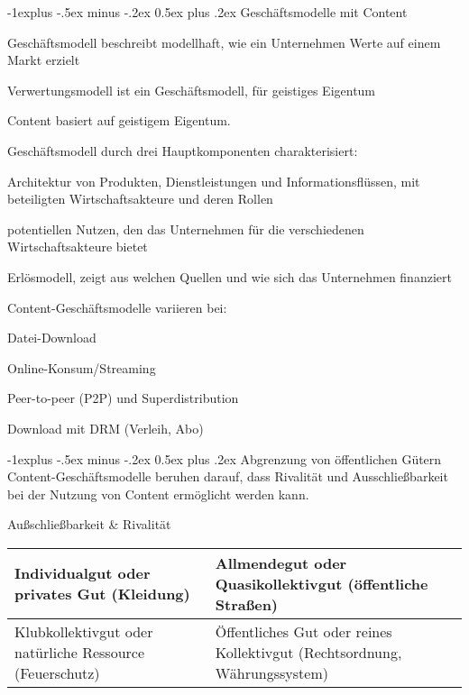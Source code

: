 \documentclass[a4paper]{article}
\makeatletter
\renewcommand{\subsection}{\@startsection{subsection}{2}{0mm}%
                                {-1explus -.5ex minus -.2ex}%
                                {0.5ex plus .2ex}%
                                {\normalfont\normalsize\bfseries}}
\makeatother
\begin{document}
\begin{multicols*}{2}
  \subsection{Geschäftsmodelle mit Content}
  \begin{itemize*}
    \item Geschäftsmodell beschreibt modellhaft, wie ein Unternehmen Werte auf einem Markt erzielt
    \item Verwertungsmodell ist ein Geschäftsmodell, für geistiges Eigentum
    \item Content basiert auf geistigem Eigentum.
    \item Geschäftsmodell durch drei Hauptkomponenten charakterisiert:
    \begin{itemize*}
      \item Architektur von Produkten, Dienstleistungen und Informationsflüssen, mit beteiligten Wirtschaftsakteure und deren Rollen
      \item potentiellen Nutzen, den das Unternehmen für die verschiedenen Wirtschaftsakteure bietet
      \item Erlösmodell, zeigt aus welchen Quellen und wie sich das Unternehmen finanziert
    \end{itemize*}
    \item Content-Geschäftsmodelle variieren bei:
    \begin{itemize*}
      \item Datei-Download
      \item Online-Konsum/Streaming
      \item Peer-to-peer (P2P) und Superdistribution
      \item Download mit DRM (Verleih, Abo)
    \end{itemize*}
  \end{itemize*}

  \subsection{Abgrenzung von öffentlichen Gütern}
  Content-Geschäftsmodelle beruhen darauf, dass Rivalität und Ausschließbarkeit bei der Nutzung von Content ermöglicht werden kann.

  Außschließbarkeit \& Rivalität
  \begin{tabular}{p{4cm} | p{4cm} }\hline
    Individualgut oder privates Gut (Kleidung)               & Allmendegut oder Quasikollektivgut (öffentliche Straßen)                  \\\hline
    Klubkollektivgut oder natürliche Ressource (Feuerschutz) & Öffentliches Gut oder reines Kollektivgut (Rechtsordnung, Währungssystem) \\\hline
  \end{tabular}


\end{multicols*}
\end{document}
